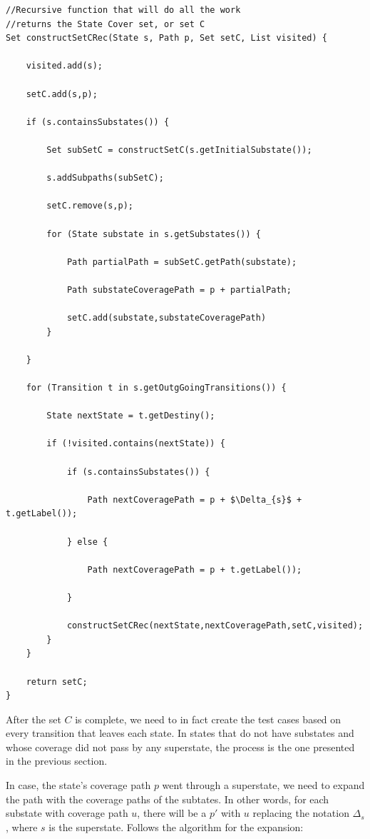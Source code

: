 \begin{lstlisting}[mathescape]
//Recursive function that will do all the work
//returns the State Cover set, or set C
Set constructSetCRec(State s, Path p, Set setC, List visited) {

	visited.add(s);

	setC.add(s,p);

	if (s.containsSubstates()) {

		Set subSetC = constructSetC(s.getInitialSubstate());	

		s.addSubpaths(subSetC);

		setC.remove(s,p);

		for (State substate in s.getSubstates()) {

			Path partialPath = subSetC.getPath(substate);

			Path substateCoveragePath = p + partialPath;

			setC.add(substate,substateCoveragePath)	
		}
		
	}
	
	for (Transition t in s.getOutgGoingTransitions()) {
		
		State nextState = t.getDestiny();

		if (!visited.contains(nextState)) {

			if (s.containsSubstates()) {
			
				Path nextCoveragePath = p + $\Delta_{s}$ + t.getLabel());

			} else {

				Path nextCoveragePath = p + t.getLabel());

			}	

			constructSetCRec(nextState,nextCoveragePath,setC,visited);	
		}
	}
	
	return setC;
}

\end{lstlisting}
 

After the set $C$ is complete, we need to in fact create the test cases based on every transition that leaves each state. In states that do not have substates and whose coverage did not pass by any superstate, the process is the one presented in the previous section.

In case, the state's coverage path $p$ went through a superstate, we need to expand the path with the coverage paths of the subtates. In other words, for each substate with coverage path $u$,  there will be a $p'$ with $u$ replacing the notation $\Delta_s$, where $s$ is the superstate. Follows the algorithm for the expansion:

